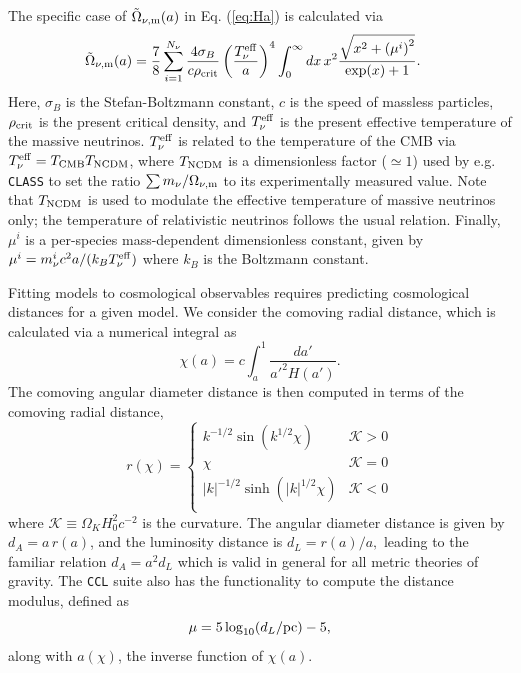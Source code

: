 \documentclass[\docopts]{\docclass}
\newcommand{\ccl}{{\tt CCL}\xspace}
\newcommand{\class}{{\tt CLASS}\xspace}
\begin{document}
The specific case of $\tilde\Omega_{\nu, {\rm m}}(a)$ in Eq. (\ref{eq:Ha}) is calculated via
\begin{align}
\tilde\Omega_{\nu, {\rm m}}(a) &= \frac{7}{8}\sum_{i=1}^{N_\nu} \frac{4 \sigma_{B}}{c \rho_{{\rm crit}}} \left(\frac{T_{\nu}^{\rm eff}}{a}\right)^4  \int_0^{\infty} dx \, x^2 \frac{\sqrt{x^2 + \left(\mu^i\right)^2}}{\exp(x) + 1}.
\label{Omnu}
\end{align}
Here, $\sigma_B$ is the Stefan-Boltzmann constant, $c$ is the speed of massless particles, $\rho_{{\rm crit}}$ is the present critical density, and $T_{\nu}^{\rm eff}$ is the present effective temperature of the massive neutrinos. $T_{\nu}^{\rm eff}$ is related to the temperature of the CMB via $T_{\nu}^{\rm eff} = T_{\rm CMB} T_{\rm NCDM}$, where $T_{\rm NCDM}$ is a dimensionless factor ($\simeq1$) used by e.g. \class to set the ratio ${\sum m_\nu}/{\Omega_{\nu, {\rm m}}}$ to its experimentally measured value. Note that $T_{\rm NCDM}$ is used to modulate the effective temperature of massive neutrinos only; the temperature of relativistic neutrinos follows the usual relation. Finally, $\mu^i$ is a per-species mass-dependent dimensionless constant, given by $\mu^i = m_{\nu}^{i}c^2 a / (k_B T_{\nu}^{\rm eff})$ where $k_B$ is the Boltzmann constant.



Fitting models to cosmological observables requires predicting cosmological distances for a given model. We consider the comoving radial distance, which is calculated via a numerical integral as
\begin{equation}
 \chi(a)= c \int_a^1 \frac{da'}{a'^2 H(a')}.
 \label{eq:comrdist}
\end{equation}
The comoving angular diameter distance is then computed in terms of the comoving radial distance,
\begin{equation}\label{eq:angdist}
 r(\chi)=\left\{\begin{array}{cc}
                 k^{-1/2}\sin(k^{1/2}\chi) & \mathcal{K}>0\\
                 \chi & \mathcal{K}=0\\
                 |k|^{-1/2}\sinh(|k|^{1/2}\chi) & \mathcal{K}<0\\
                \end{array}\right.
\end{equation}
where $\mathcal{K} \equiv \Omega_K H_0^2 c^{-2}$ is the curvature.
The angular diameter distance is given by $d_A=a\,r(a)$, and the luminosity distance is
$d_L=r(a)/a,$ leading to the familiar relation $d_A = a^2d_L$ which is valid in general for all metric theories of gravity.
The \ccl suite also has the functionality to compute the distance modulus, defined as
\begin{equation}\label{eq:distmod}
    \mu = 5 \log_{10}(d_L / {\rm pc})-5,
\end{equation}
along with $a(\chi)$, the inverse function of $\chi(a)$.
\end{document}
